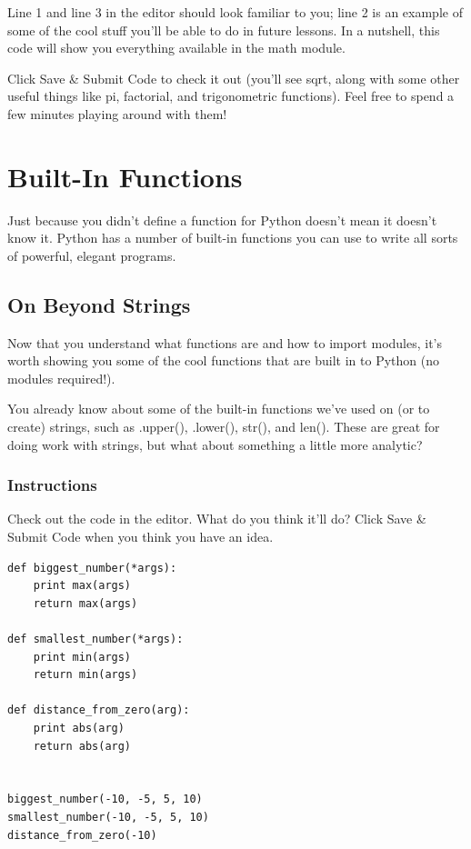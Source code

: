 \documentclass[12pt,a4paper,final,twoside,onecolumn,titlepage]{book}
\begin{document}
Line 1 and line 3 in the editor should look familiar to you; line 2 is an example of some of the cool stuff you'll be able to do in future lessons. In a nutshell, this code will show you everything available in the math module.

Click Save \& Submit Code to check it out (you'll see sqrt, along with some other useful things like pi, factorial, and trigonometric functions). Feel free to spend a few minutes playing around with them!



\section{Built-In Functions}

    Just because you didn't define a function for Python doesn't mean it doesn't know it. Python has a number of built-in functions you can use to write all sorts of powerful, elegant programs.

\subsection{On Beyond Strings}

Now that you understand what functions are and how to import modules, it's worth showing you some of the cool functions that are built in to Python (no modules required!).

You already know about some of the built-in functions we've used on (or to create) strings, such as .upper(), .lower(), str(), and len(). These are great for doing work with strings, but what about something a little more analytic?
\subsubsection{Instructions}

Check out the code in the editor. What do you think it'll do? Click Save \& Submit Code when you think you have an idea.

\begin{lstlisting}
def biggest_number(*args):
    print max(args)
    return max(args)
    
def smallest_number(*args):
    print min(args)
    return min(args)

def distance_from_zero(arg):
    print abs(arg)
    return abs(arg)


biggest_number(-10, -5, 5, 10)
smallest_number(-10, -5, 5, 10)
distance_from_zero(-10)
\end{lstlisting}
\end{document}

